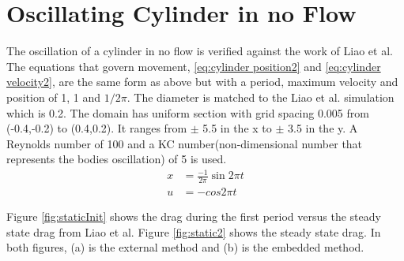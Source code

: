 \documentclass[onehalf,11pt]{beavtex}
\begin{document}
\section{Oscillating Cylinder in no Flow}
\label{sec:Oscillating Cylinder in no Flow}
The oscillation of a cylinder in no flow is verified against the work of Liao et al\cite{liao2010simulating}. 
The equations that govern movement, \ref{eq:cylinder position2} and \ref{eq:cylinder velocity2}, are the same form as above but with a period, maximum velocity and position of 1, 1 and $1/2\pi$.
The diameter is matched to the Liao et al. simulation which is 0.2. 
The domain has uniform section with grid spacing 0.005 from (-0.4,-0.2) to (0.4,0.2). 
It ranges from $\pm$ 5.5 in the x to $\pm$ 3.5 in the y. 
A Reynolds number of 100 and a KC number(non-dimensional number that represents the bodies oscillation) of 5 is used.
\begin{align}
x&=\frac{-1}{2\pi}\sin{2\pi t}\label{eq:cylinder position2}\\
u&=-cos{2\pi t}\;\label{eq:cylinder velocity2}
\end{align}

Figure \ref{fig:staticInit} shows the drag during the first period versus the steady state drag from Liao et al.
Figure \ref{fig:static2} shows the steady state drag.
In both figures, (a) is the external method and (b) is the embedded method.
 
\end{document}

